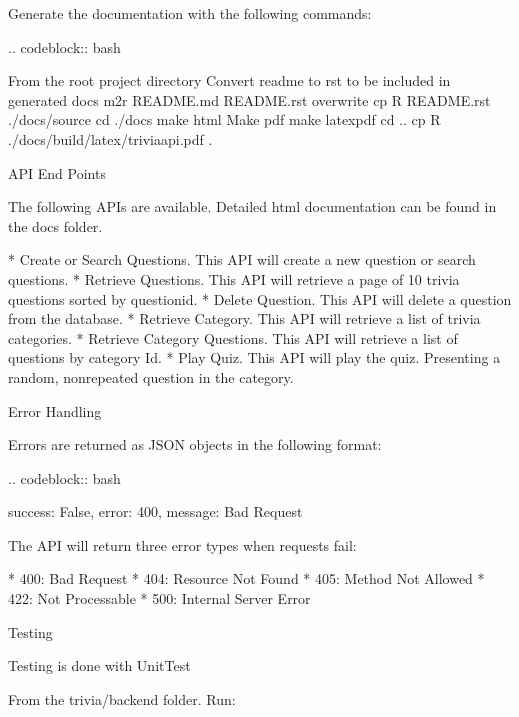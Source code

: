 \documentclass[letterpaper,10pt,english]{sphinxmanual}
\begin{document}
\begin{sphinxVerbatim}[commandchars=\\\{\}]
Generate the documentation with the following commands:

.. code\PYGZhy{}block:: bash

   \PYGZsh{} From the root project directory
   \PYGZsh{} Convert readme to rst to be included in generated docs
   m2r README.md README.rst \PYGZhy{}\PYGZhy{}overwrite
   cp \PYGZhy{}R README.rst ./docs/source
   cd ./docs
   make html
   \PYGZsh{} Make pdf
   make latexpdf
   cd ..
   cp \PYGZhy{}R ./docs/build/latex/triviaapi.pdf .

API End Points
\PYGZhy{}\PYGZhy{}\PYGZhy{}\PYGZhy{}\PYGZhy{}\PYGZhy{}\PYGZhy{}\PYGZhy{}\PYGZhy{}\PYGZhy{}\PYGZhy{}\PYGZhy{}\PYGZhy{}\PYGZhy{}

The following APIs are available. Detailed html documentation can be found in the \PYGZsq{}docs\PYGZsq{} folder.


* Create or Search Questions. This API will create a new question or search questions.
* Retrieve Questions. This API will retrieve a page of 10 trivia questions sorted by question\PYGZus{}id.
* Delete Question. This API will delete a question from the database.
* Retrieve Category. This API will retrieve a list of trivia categories.
* Retrieve Category Questions. This API will retrieve a list of questions by category Id.
* Play Quiz. This API will play the quiz. Presenting a random, non\PYGZhy{}repeated question in the category.

Error Handling
\PYGZhy{}\PYGZhy{}\PYGZhy{}\PYGZhy{}\PYGZhy{}\PYGZhy{}\PYGZhy{}\PYGZhy{}\PYGZhy{}\PYGZhy{}\PYGZhy{}\PYGZhy{}\PYGZhy{}\PYGZhy{}

Errors are returned as JSON objects in the following format:

.. code\PYGZhy{}block:: bash

   \PYGZob{}
       \PYGZdq{}success\PYGZdq{}: False,
       \PYGZdq{}error\PYGZdq{}: 400,
       \PYGZdq{}message\PYGZdq{}: \PYGZdq{}Bad Request\PYGZdq{}
   \PYGZcb{}

The API will return three error types when requests fail:


* 400: Bad Request
* 404: Resource Not Found
* 405: Method Not Allowed
* 422: Not Processable
* 500: Internal Server Error

Testing
\PYGZhy{}\PYGZhy{}\PYGZhy{}\PYGZhy{}\PYGZhy{}\PYGZhy{}\PYGZhy{}

Testing is done with UnitTest

From the trivia/backend folder. Run:


\end{sphinxVerbatim}
\end{document}
